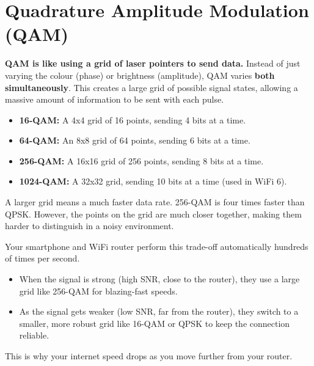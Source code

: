 
\chapter{Quadrature Amplitude Modulation (QAM)}
\label{ch:qam}

\begin{nontechnical}
    \textbf{QAM is like using a grid of laser pointers to send data.} Instead of just varying the colour (phase) or brightness (amplitude), QAM varies \textbf{both simultaneously}. This creates a large grid of possible signal states, allowing a massive amount of information to be sent with each pulse.

    \begin{itemize}
        \item \textbf{16-QAM:} A 4x4 grid of 16 points, sending 4 bits at a time.
        \item \textbf{64-QAM:} An 8x8 grid of 64 points, sending 6 bits at a time.
        \item \textbf{256-QAM:} A 16x16 grid of 256 points, sending 8 bits at a time.
        \item \textbf{1024-QAM:} A 32x32 grid, sending 10 bits at a time (used in WiFi 6).
    \end{itemize}

     A larger grid means a much faster data rate. 256-QAM is four times faster than QPSK. However, the points on the grid are much closer together, making them harder to distinguish in a noisy environment.

     Your smartphone and WiFi router perform this trade-off automatically hundreds of times per second.
    \begin{itemize}
        \item When the signal is strong (high SNR, close to the router), they use a large grid like 256-QAM for blazing-fast speeds.
        \item As the signal gets weaker (low SNR, far from the router), they switch to a smaller, more robust grid like 16-QAM or QPSK to keep the connection reliable.
    \end{itemize}
    This is why your internet speed drops as you move further from your router.
\end{nontechnical}


